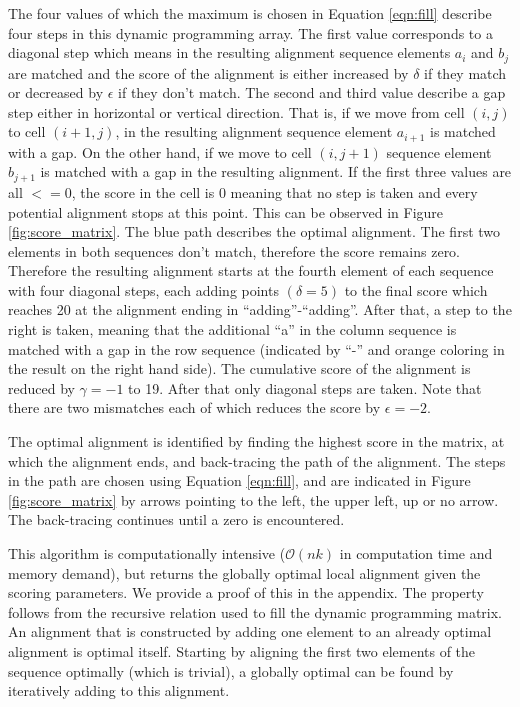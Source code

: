 \documentclass[12pt]{article} %
\begin{document}
The four values of which the maximum is chosen in Equation \ref{eqn:fill}
describe four steps in this dynamic programming array. The first value
corresponds to a diagonal step which means in the resulting alignment sequence
elements $a_i$ and $b_j$ are matched and the score of the alignment is either
increased by $\delta$ if they match or decreased by $\epsilon$ if they don't
match. The second and third value describe a gap step either in horizontal or
vertical direction. That is, if we move from cell $(i,j)$ to cell $(i+1,j)$, in
the resulting alignment sequence element $a_{i+1}$ is matched with a gap. On the
other hand, if we move to cell $(i, j+1)$ sequence element $b_{j+1}$ is matched
with a gap in the resulting alignment. If the first three values are all $<= 0$,
the score in the cell is 0 meaning that no step is taken and every potential
alignment stops at this point. This can be observed in Figure \ref{fig:score_matrix}. The blue path describes the optimal alignment. The first two elements in both sequences don't match, therefore the score remains zero. Therefore the resulting alignment starts at the fourth element of each sequence with four diagonal steps, each adding points $(\delta = 5)$ to the final score which reaches 20 at the alignment ending in ``adding''-``adding''. After that, a step to the right is taken, meaning that the additional ``a'' in the column sequence is matched with a gap in the row sequence (indicated by ``-'' and orange coloring in the result on the right hand side). The cumulative score of the alignment is reduced by $\gamma = -1$ to 19. After that only diagonal steps are taken. Note that there are two mismatches each of which reduces the score by $\epsilon = -2$. 

The optimal alignment is identified by finding the highest score in the matrix,
at which the alignment ends, and back-tracing the path of the alignment. The
steps in the path are chosen using Equation \ref{eqn:fill}, and are indicated in
Figure \ref{fig:score_matrix} by arrows pointing to the left, the upper left, up
or no arrow. The back-tracing continues until a  zero is encountered.

This algorithm is computationally intensive ($\mathcal{O}(nk)$ in computation
time and memory demand), but returns the globally optimal local alignment given the scoring parameters. We provide a proof of this in the appendix. The property follows from the recursive relation used to fill the dynamic programming matrix. An alignment that is constructed by adding one element to an already optimal alignment is optimal itself. Starting by aligning the first two elements of the sequence optimally (which is trivial), a globally optimal can be found by iteratively adding to this alignment.
\end{document}

